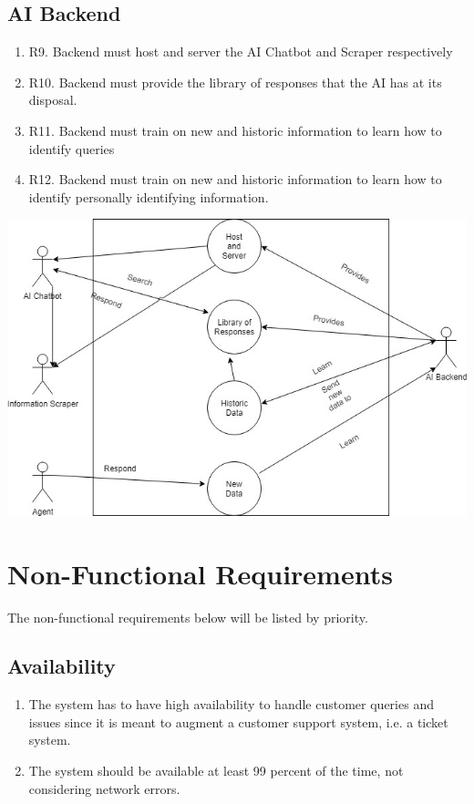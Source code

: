 \documentclass[11pt]{article}
\begin{document}
\subsection{AI Backend}
\begin{enumerate}
    \item R9. Backend must host and server the AI Chatbot and Scraper respectively
    \item R10. Backend must provide the library of responses that the AI has at its disposal.
    \item R11. Backend must train on new and historic information to learn how to identify queries
    \item R12. Backend must train on new and historic information to learn how to identify personally identifying information.
\end{enumerate}
\includegraphics[width=1.0\textwidth]{images/AI_Backend_UCD.jpg}
\section{Non-Functional Requirements}
The non-functional requirements below will be listed by priority.
\subsection{Availability}
\begin{enumerate}
    \item The system has to have high availability to handle customer queries and issues since it is meant to augment a customer support system, i.e. a ticket system.
    \item The system should be available at least 99 percent of the time, not considering network errors.
\end{enumerate}
\end{document}
